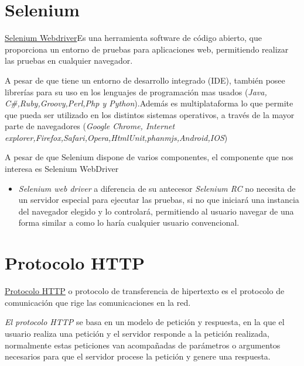 \section{Selenium}

\href {https://www.seleniumhq.org/projects/}{Selenium Webdriver}Es una herramienta software de código abierto, que proporciona un entorno de pruebas para aplicaciones web, permitiendo realizar las pruebas en cualquier navegador.

A pesar de que tiene un entorno de desarrollo integrado (IDE), también posee librerías para su uso en los lenguajes de programación mas usados (\emph{Java, C\#,Ruby,Groovy,Perl,Php y Python}).Además es multiplataforma lo  que permite que pueda ser utilizado en los distintos sistemas operativos, a través de la mayor parte de navegadores (\emph{Google Chrome, Internet explorer,Firefox,Safari,Opera,HtmlUnit,phanmjs,Android,IOS})\cite{selenium}

A pesar de que Selenium dispone de varios componentes, el componente que nos interesa es Selenium WebDriver 

\begin{itemize}
	\item \emph{Selenium web driver} a diferencia de su antecesor \emph{Selenium RC} no necesita de un servidor especial para ejecutar las pruebas, si no que 
iniciará una instancia del navegador elegido y lo controlará, permitiendo al usuario navegar de una forma similar a como lo haría cualquier usuario convencional.
\end{itemize}




\section{Protocolo HTTP}\label{http}

\href {https://es.wikipedia.org/wiki/Protocolo_de_transferencia_de_hipertexto}{Protocolo HTTP} o protocolo de transferencia de hipertexto\cite{http} es el protocolo de comunicación que rige las comunicaciones en la red.

\emph{El protocolo HTTP} se basa en un modelo de petición y respuesta, en la que el usuario realiza una petición y el servidor responde a la petición realizada, normalmente estas peticiones van acompañadas de parámetros o argumentos necesarios para que el servidor procese la petición y genere una respuesta.

